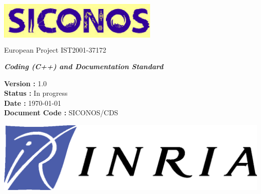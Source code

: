 


%

\thispagestyle{empty}

\begin{center}
\includegraphics[height=23mm, width=77mm]{figure/siconos.eps}\\
\textsf{European Project  IST2001-37172}\\[6cm]
\end{center}

\begin{center}
\huge
\textsf{\textbf{\textit{Coding (C++) and Documentation Standard}}}\\[2.5cm]
\end{center}

\large
\begin{center}
\textsf{\textbf{Version :} 1.0}\\
\textsf{\textbf{Status :}  In progress}\\
\textsf{\textbf{Date : } \today}\\
\textsf{\textbf{Document Code :} SICONOS/CDS}\\[5cm]

\end{center}

\normalsize

\begin{flushright}
\includegraphics[scale=0.3]{figure/Logo-INRIA.eps}
\end{flushright}

\clearpage





